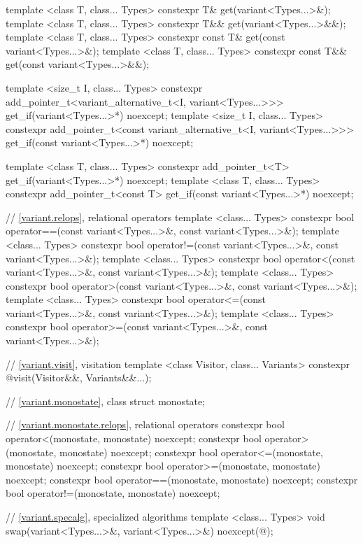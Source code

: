 \begin{codeblock}
{  template <class T, class... Types>
    constexpr T& get(variant<Types...>&);
  template <class T, class... Types>
    constexpr T&& get(variant<Types...>&&);
  template <class T, class... Types>
    constexpr const T& get(const variant<Types...>&);
  template <class T, class... Types>
    constexpr const T&& get(const variant<Types...>&&);

  template <size_t I, class... Types>
    constexpr add_pointer_t<variant_alternative_t<I, variant<Types...>>>
      get_if(variant<Types...>*) noexcept;
  template <size_t I, class... Types>
    constexpr add_pointer_t<const variant_alternative_t<I, variant<Types...>>>
      get_if(const variant<Types...>*) noexcept;

  template <class T, class... Types>
    constexpr add_pointer_t<T>
      get_if(variant<Types...>*) noexcept;
  template <class T, class... Types>
    constexpr add_pointer_t<const T>
      get_if(const variant<Types...>*) noexcept;

  // \ref{variant.relops}, relational operators
  template <class... Types>
    constexpr bool operator==(const variant<Types...>&, const variant<Types...>&);
  template <class... Types>
    constexpr bool operator!=(const variant<Types...>&, const variant<Types...>&);
  template <class... Types>
    constexpr bool operator<(const variant<Types...>&, const variant<Types...>&);
  template <class... Types>
    constexpr bool operator>(const variant<Types...>&, const variant<Types...>&);
  template <class... Types>
    constexpr bool operator<=(const variant<Types...>&, const variant<Types...>&);
  template <class... Types>
    constexpr bool operator>=(const variant<Types...>&, const variant<Types...>&);

  // \ref{variant.visit}, visitation
  template <class Visitor, class... Variants>
    constexpr @\seebelow@ visit(Visitor&&, Variants&&...);

  // \ref{variant.monostate}, class 
  struct monostate;

  // \ref{variant.monostate.relops},  relational operators
  constexpr bool operator<(monostate, monostate) noexcept;
  constexpr bool operator>(monostate, monostate) noexcept;
  constexpr bool operator<=(monostate, monostate) noexcept;
  constexpr bool operator>=(monostate, monostate) noexcept;
  constexpr bool operator==(monostate, monostate) noexcept;
  constexpr bool operator!=(monostate, monostate) noexcept;

  // \ref{variant.specalg}, specialized algorithms
  template <class... Types>
    void swap(variant<Types...>&, variant<Types...>&) noexcept(@\seebelow@);

}
\end{codeblock}

